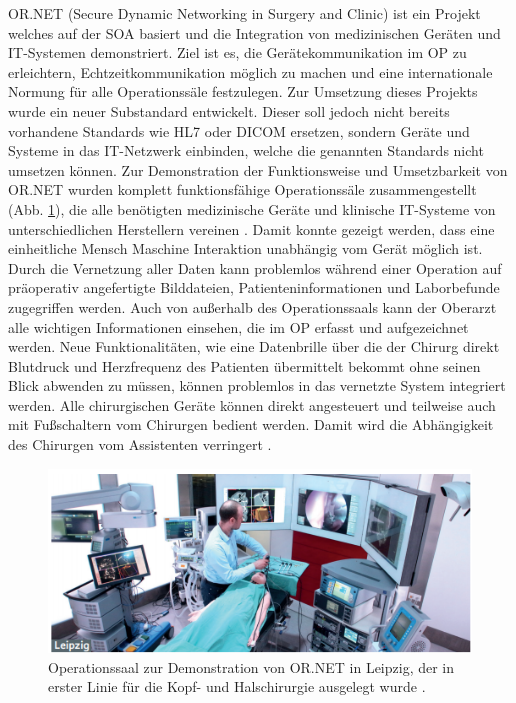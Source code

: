 OR.NET (Secure Dynamic Networking in Surgery and Clinic) ist ein Projekt welches auf der SOA basiert und die Integration von medizinischen Geräten und IT-Systemen demonstriert. Ziel ist es, die Gerätekommunikation im OP zu erleichtern, Echtzeitkommunikation möglich zu machen und eine internationale Normung für alle Operationssäle festzulegen. 
Zur Umsetzung dieses Projekts wurde ein neuer Substandard entwickelt. Dieser soll jedoch nicht bereits vorhandene Standards wie HL7 oder DICOM ersetzen, sondern Geräte und Systeme in das IT-Netzwerk einbinden, welche die genannten Standards nicht umsetzen können.
Zur Demonstration der Funktionsweise und Umsetzbarkeit von OR.NET wurden komplett funktionsfähige Operationssäle zusammengestellt (Abb. \ref{fig:ornet}), die alle benötigten medizinische Geräte und klinische IT-Systeme von unterschiedlichen Herstellern vereinen \cite{ORnet}.
Damit konnte gezeigt werden, dass eine einheitliche Mensch Maschine Interaktion unabhängig vom Gerät möglich ist. Durch die Vernetzung aller Daten kann problemlos während einer Operation auf präoperativ angefertigte Bilddateien, Patienteninformationen und Laborbefunde zugegriffen werden. Auch von außerhalb des Operationssaals kann der Oberarzt alle wichtigen Informationen einsehen, die im OP erfasst und aufgezeichnet werden. Neue Funktionalitäten, wie eine Datenbrille über die der Chirurg direkt Blutdruck und Herzfrequenz des Patienten übermittelt bekommt ohne seinen Blick abwenden zu müssen, können problemlos in das vernetzte System integriert werden. Alle chirurgischen Geräte können direkt angesteuert und teilweise auch mit Fußschaltern vom Chirurgen bedient werden. Damit wird die Abhängigkeit des Chirurgen vom Assistenten verringert \cite{ORnetWebsite}.

\begin{figure} [H]
	\includegraphics[scale = 0.8]{Content/Pictures/ornet.png}
	\caption{Operationssaal zur Demonstration von OR.NET in Leipzig, der in erster Linie für die Kopf- und Halschirurgie ausgelegt wurde \cite{ORnetWebsite}.}
	\label{fig:ornet}
\end{figure}

